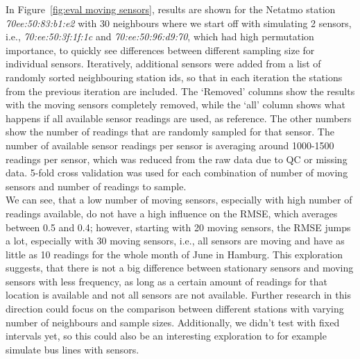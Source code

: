 In Figure~\ref{fig:eval moving sensors}, results are shown for the Netatmo station \textit{70ee:50:83:b1:e2} with 30 neighbours where we start off with simulating 2 sensors, i.e., \textit{70:ee:50:3f:1f:1c} and \textit{70:ee:50:96:d9:70}, which had high permutation importance, to quickly see differences between different sampling size for individual sensors. Iteratively, additional sensors were added from a list of randomly sorted neighbouring station ids, so that in each iteration the stations from the previous iteration are included. The `Removed' columns show the results with the moving sensors completely removed, while the `all' column shows what happens if all available sensor readings are used, as reference. The other numbers show the number of readings that are randomly sampled for that sensor. The number of available sensor readings per sensor is averaging around 1000-1500 readings per sensor, which was reduced from the raw data due to QC or missing data. 5-fold cross validation was used for each combination of number of moving sensors and number of readings to sample.\\
We can see, that a low number of moving sensors, especially with high number of readings available, do not have a high influence on the RMSE, which averages between 0.5 and 0.4; however, starting with 20 moving sensors, the RMSE jumps a lot, especially with 30 moving sensors, i.e., all sensors are moving and have as little as 10 readings for the whole month of June in Hamburg. This exploration suggests, that there is not a big difference between stationary sensors and moving sensors with less frequency, as long as a certain amount of readings for that location is available and not all sensors are not available. Further research in this direction could focus on the comparison between different stations with varying number of neighbours and sample sizes. Additionally, we didn't test with fixed intervals yet, so this could also be an interesting exploration to for example simulate bus lines with sensors.



